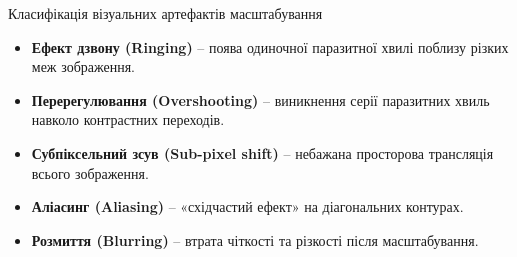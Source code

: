 \documentclass[11pt, aspectratio=169]{beamer}
\begin{document}
	\begin{frame}{Класифікація візуальних артефактів масштабування}
		\begin{itemize}
			\item \textbf{Ефект дзвону (Ringing)} – поява одиночної паразитної хвилі поблизу різких меж зображення.
			\item \textbf{Перерегулювання (Overshooting)} – виникнення серії паразитних хвиль навколо контрастних переходів.
			\item \textbf{Субпіксельний зсув (Sub-pixel shift)} – небажана просторова трансляція всього зображення. 
			\item \textbf{Аліасинг (Aliasing)} – «східчастий ефект» на діагональних контурах. 
			\item \textbf{Розмиття (Blurring)} – втрата чіткості та різкості після масштабування.
		\end{itemize}
		\vspace{0.3cm}
	\end{frame}
\end{document}
